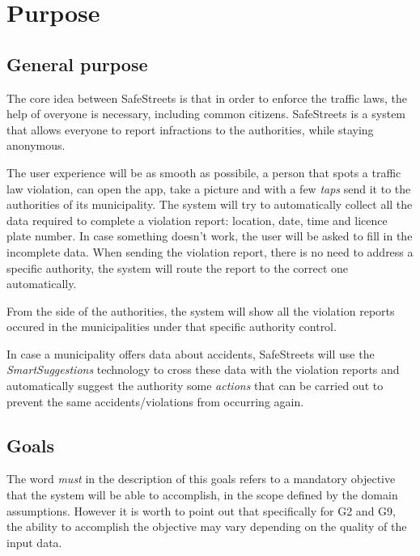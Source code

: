 \section{Purpose}
\subsection{General purpose}
The core idea between SafeStreets is that in order to enforce the traffic laws,
the help of overyone is necessary, including common citizens.
SafeStreets is a system that allows everyone to report infractions to the
authorities, while staying anonymous.

The user experience will be as smooth as possibile, a person that spots a
traffic law violation, can open the app, take a picture and with a few
\emph{taps} send it to the authorities of its municipality.
The system will try to automatically collect all the data required to complete
a violation report: location, date, time and licence plate number. In case
something doesn't work, the user will be asked to fill in the incomplete data.
When sending the violation report, there is no need to address a specific
authority, the system will route the report to the correct one automatically.

From the side of the authorities, the system will show all the violation reports
occured in the municipalities under that specific authority control.

In case a municipality offers data about accidents, SafeStreets will use the
\emph{SmartSuggestions} technology to cross these data with the violation 
reports and automatically suggest the authority some \emph{actions} that can be
carried out to prevent the same accidents/violations from occurring again.

\subsection{Goals}

\begin{description}
\end{description}

\noindent
The word \emph{must} in the description of this goals refers to a mandatory
objective that the system will be able to accomplish, in the scope defined
by the domain assumptions.
However it is worth to point out that specifically for G2 and G9,
the ability to accomplish the objective may vary depending on the
quality of the input data.